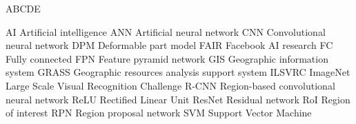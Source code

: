 
\begin{seznamzkratek}{ABCDE}

	      {AI}
	      {Artificial intelligence}
	      {ANN}
	      {Artificial neural network}
	      {CNN}
	      {Convolutional neural network}
	      {DPM}
	      {Deformable part model}
	      {FAIR}
	      {Facebook AI research}
	      {FC}
	      {Fully connected}
	      {FPN}
	      {Feature pyramid network}
	      {GIS}
	      {Geographic information system}
	      {GRASS}
	      {Geographic resources analysis support system}
	      {ILSVRC}
	      {ImageNet Large Scale Visual Recognition Challenge}
	      {R-CNN}
	      {Region-based convolutional neural network}
	      {ReLU}
	      {Rectified Linear Unit}
	      {ResNet}
	      {Residual network}
	      {RoI}
	      {Region of interest}
	      {RPN}
	      {Region proposal network}
	      {SVM}
	      {Support Vector Machine}
	      
\end{seznamzkratek}